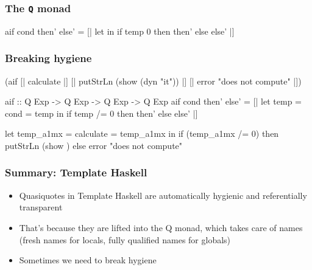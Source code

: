 \documentclass[hyperref={bookmarks=false}]{beamer}
\begin{document}
\begin{frame}[fragile]
\frametitle{The \texttt{Q} monad}
\begin{semiverbatim}
aif cond then' else' =
  [| let 
     in if temp  0 then {\textdollar}then' else {\textdollar}else' |]

          \visible<2>{(LetE [ValD (VarP temp) (NormalB cond) [],}
                 \visible<2>{ValD (VarP it) (NormalB (VarE temp)) []]}

\end{semiverbatim}
\end{frame}

\begin{frame}[fragile]
\frametitle{Breaking hygiene}
\begin{semiverbatim}
{\textdollar}(aif [| calculate |]
  [| putStrLn (show \alert{{\textdollar}(dyn "it")}) |]
  [| error "does not compute" |])

aif :: Q Exp -> Q Exp -> Q Exp -> Q Exp
aif cond then' else' =
  [| let temp = {\textdollar}cond
         \text{\color{red}{it}} = temp
     in if temp /= 0 then {\textdollar}then' else {\textdollar}else' |]

let temp_a1mx = calculate
    \text{\color{red}{it_a1my}} = temp_a1mx
in if (temp_a1mx /= 0)
   then putStrLn (show \text{\color{blue}{it_a1my}})
   else error "does not compute"
\end{semiverbatim}
\end{frame}

\begin{frame}[fragile]
\frametitle{Summary: Template Haskell}
\begin{itemize}
\item Quasiquotes in Template Haskell are automatically hygienic and referentially transparent
\item That's because they are lifted into the Q monad, which takes care of names (fresh names for locals,
fully qualified names for globals)
\item Sometimes we need to break hygiene
\end{itemize}
\end{frame}
\end{document}
